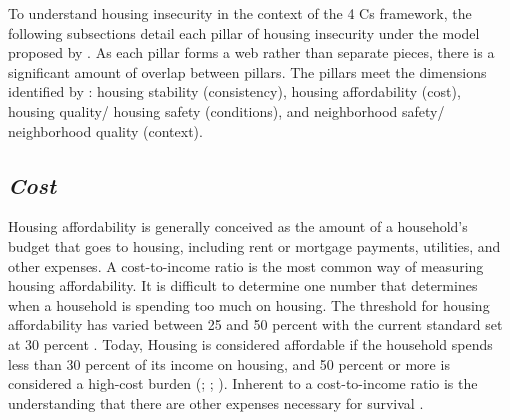  

To understand housing insecurity in the context of the 4 Cs framework, the following subsections detail each pillar of housing insecurity under the model proposed by \citet{hernandez_housing_2019}. As each pillar forms a web rather than separate pieces, there is a significant amount of overlap between pillars. The pillars meet the dimensions identified by \citet{cox_road_2019}: housing stability (consistency), housing affordability (cost), housing quality/ housing safety (conditions), and neighborhood safety/ neighborhood quality (context). %

\subsection{\textit{Cost}} 

Housing affordability is generally conceived as the amount of a household's budget that goes to housing, including rent or mortgage payments, utilities, and other expenses. A cost-to-income ratio is the most common way of measuring housing affordability. It is difficult to determine one number that determines when a household is spending too much on housing. The threshold for housing affordability has varied between 25 and 50 percent with the current standard set at 30 percent \citep{kropczynski_insights_2012}. Today, Housing is considered affordable if the household spends less than 30 percent of its income on housing, and 50 percent or more is considered a high-cost burden (\citealp{braveman_housing_2011}; \citealp{swope_housing_2020}; \citealp{weicher_housing_2006}). Inherent to a cost-to-income ratio is the understanding that there are other expenses necessary for survival \citep{herbert_measuring_2018}.  


